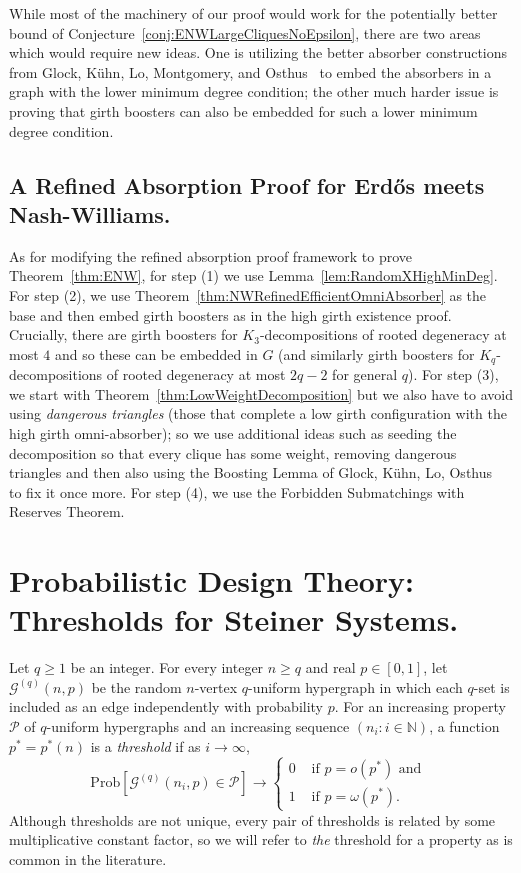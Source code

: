 \documentclass[twoside,leqno]{article}
\begin{document}
While most of the machinery of our proof would work for the potentially better bound of Conjecture~\ref{conj:ENWLargeCliquesNoEpsilon}, there are two areas which would require new ideas. One is utilizing the better absorber constructions from Glock, K\"{u}hn, Lo, Montgomery, and Osthus~\cite{GKLMO19} to embed the absorbers in a graph with the lower minimum degree condition; the other much harder issue is proving that girth boosters can also be embedded for such a lower minimum degree condition.

\subsection{A Refined Absorption Proof for Erd\H{o}s meets Nash-Williams.} As for modifying the refined absorption proof framework to prove Theorem~\ref{thm:ENW}, for step (1) we use Lemma~\ref{lem:RandomXHighMinDeg}. For step (2), we use Theorem~\ref{thm:NWRefinedEfficientOmniAbsorber} as the base and then embed girth boosters as in the high girth existence proof. Crucially, there are girth boosters for $K_3$-decompositions of rooted degeneracy at most $4$ and so these can be embedded in $G$ (and similarly girth boosters for $K_q$-decompositions of rooted degeneracy at most $2q-2$ for general $q$). For step (3), we start with Theorem~\ref{thm:LowWeightDecomposition} but we also have to avoid using \emph{dangerous triangles} (those that complete a low girth configuration with the high girth omni-absorber); so we use additional ideas such as seeding the decomposition so that every clique has some weight, removing dangerous triangles and then also using the Boosting Lemma of Glock, K\"uhn, Lo, Osthus~\cite{GKLO16} to fix it once more. For step (4), we use the Forbidden Submatchings with Reserves Theorem.

\section{Probabilistic Design Theory: Thresholds for Steiner Systems.}

\begin{definition}
    Let $q \geq 1$ be an integer.  For every integer $n \geq q$ and real $p \in [0,1]$, let $\mathcal{G}^{(q)}(n,p)$ be the random $n$-vertex $q$-uniform hypergraph in which each $q$-set is included as an edge independently with probability $p$.
    For an increasing property $\mathcal{P}$ of $q$-uniform hypergraphs and an increasing sequence $(n_i : i \in \mathbb N)$, a function $p^*=p^*(n)$ is a \textit{threshold} if as $i \rightarrow \infty$,
\begin{equation*}
\textrm{Prob}\left[ \mathcal{G}^{(q)}(n_i,p) \in \mathcal{P} \right]\rightarrow 
 \begin{cases}
      0 & \text{ if }  p=o(p^*) \text{ and }\\
      1 & \text { if } p=\omega(p^*).
    \end{cases} 
 \end{equation*}   
  Although thresholds are not unique, every pair of thresholds is related by some multiplicative constant factor, so we will refer to \textit{the} threshold for a property as is common in the literature.
\end{definition}
\end{document}
